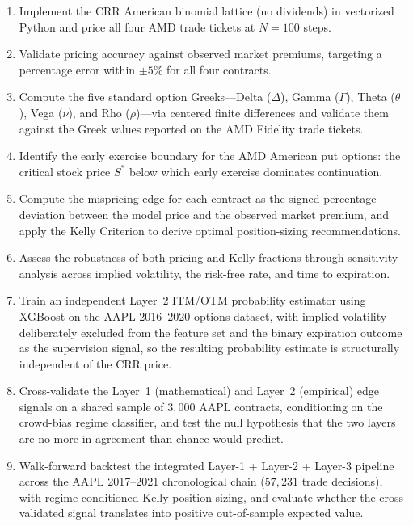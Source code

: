 \documentclass[12pt, letterpaper]{article}
\begin{document}
\begin{enumerate}
  \item Implement the CRR American binomial lattice (no dividends) in
        vectorized Python and price all four AMD trade tickets at
        $N = 100$ steps.
  \item Validate pricing accuracy against observed market premiums,
        targeting a percentage error within $\pm 5\%$ for all four
        contracts.
  \item Compute the five standard option Greeks---Delta ($\Delta$),
        Gamma ($\Gamma$), Theta ($\theta$), Vega ($\nu$), and Rho
        ($\rho$)---via centered finite differences and validate them
        against the Greek values reported on the AMD Fidelity trade
        tickets.
  \item Identify the early exercise boundary for the AMD American put
        options: the critical stock price $S^{*}$ below which early
        exercise dominates continuation.
  \item Compute the mispricing edge for each contract as the signed
        percentage deviation between the model price and the observed
        market premium, and apply the Kelly Criterion to derive
        optimal position-sizing recommendations.
  \item Assess the robustness of both pricing and Kelly fractions
        through sensitivity analysis across implied volatility, the
        risk-free rate, and time to expiration.
  \item Train an independent Layer~2 ITM/OTM probability estimator
        using XGBoost on the AAPL 2016--2020 options dataset, with
        implied volatility deliberately excluded from the feature set
        and the binary expiration outcome as the supervision signal,
        so the resulting probability estimate is structurally
        independent of the CRR price.
  \item Cross-validate the Layer~1 (mathematical) and Layer~2
        (empirical) edge signals on a shared sample of $3{,}000$ AAPL
        contracts, conditioning on the crowd-bias regime classifier,
        and test the null hypothesis that the two layers are no more
        in agreement than chance would predict.
  \item Walk-forward backtest the integrated Layer-1 + Layer-2 +
        Layer-3 pipeline across the AAPL 2017--2021 chronological
        chain ($57{,}231$ trade decisions), with regime-conditioned
        Kelly position sizing, and evaluate whether the
        cross-validated signal translates into positive out-of-sample
        expected value.
\end{enumerate}
\end{document}
